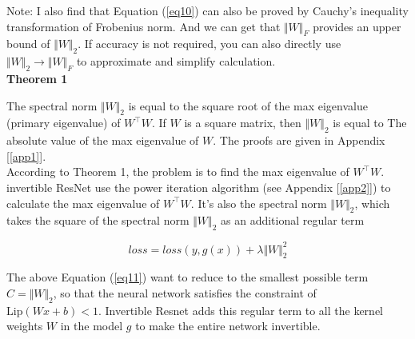 \documentclass[final]{cvpr}
\begin{document}
Note: I also find that Equation (\ref{eq10}) can also be proved by Cauchy's inequality transformation of Frobenius norm. And we can get that $\Vert W\Vert_F$ provides an upper bound of $\Vert W\Vert_2$. If accuracy is not required, you can also directly use $\Vert W\Vert_2 \to \Vert W\Vert_F$ to approximate and simplify calculation.\\

\noindent \textbf{Theorem 1}

The spectral norm $\Vert W\Vert_2$ is equal to the square root of the max eigenvalue (primary eigenvalue) of $W^{\top}W$. If $W$ is a square matrix, then $\Vert W\Vert_2$ is equal to The absolute value of the max eigenvalue of $W$. The proofs are given in Appendix [\ref{app1}].\\


According to Theorem 1, the problem is to find the max eigenvalue of $W^{\top}W$. invertible ResNet use the power iteration algorithm (see Appendix [\ref{app2}]) to calculate the max eigenvalue of $W^{\top}W$. It's also the spectral norm $\Vert W\Vert_2$, which takes the square of the spectral norm $\Vert W\Vert_2$ as an additional regular term

\begin{equation}
   loss = loss(y, g(x)) + \lambda \Vert W\Vert_2^2
   \label{eq11}
\end{equation}

The above Equation (\ref{eq11}) want to reduce to the smallest possible term $C=\Vert W\Vert_2$, so that the neural network satisfies the constraint of $\text{Lip}(Wx+b)<1$. Invertible Resnet adds this regular term to all the kernel weights $W$ in the model $g$ to make the entire network invertible.
\end{document}
